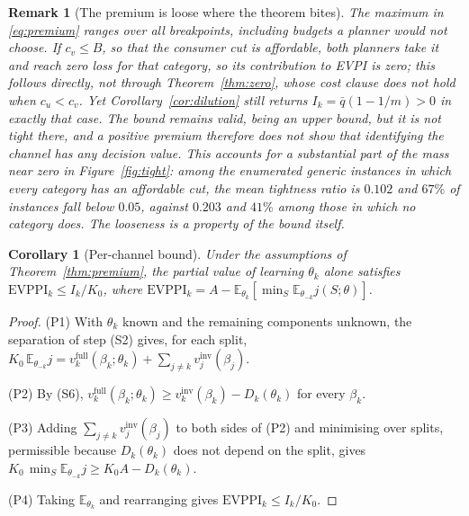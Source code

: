 \documentclass[pdflatex,sn-mathphys-num]{sn-jnl}
\theoremstyle{thmstyleone}
\newtheorem{corollary}[theorem]{Corollary}
\theoremstyle{thmstyletwo}
\newtheorem{remark}{Remark}
\theoremstyle{thmstylethree}
\newcommand{\evppi}{\mathrm{EVPPI}}
\begin{document}
\begin{remark}[The premium is loose where the theorem bites]\label{rem:loose}
The maximum in \eqref{eq:premium} ranges over all breakpoints, including
budgets a planner would not choose. If $c_v\le B$, so that the consumer cut is
affordable, both planners take it and reach zero loss for that category, so
its contribution to EVPI is zero; this follows directly, not through
Theorem~\ref{thm:zero}, whose cost clause does not hold when $c_u<c_v$. Yet
Corollary~\ref{cor:dilution} still returns $I_k=\bar q(1-1/m)>0$ in exactly
that case. The bound remains valid, being an upper bound, but it is not tight
there, and a positive premium therefore does not show that identifying the
channel has any decision value. This accounts for a substantial part of the mass near zero in
Figure~\ref{fig:tight}: among the enumerated generic instances in which every
category has an affordable cut, the mean tightness ratio is $0.102$ and
$67\%$ of instances fall below $0.05$, against $0.203$ and $41\%$ among those
in which no category does. The looseness is a property of the bound itself.
\end{remark}

\begin{corollary}[Per-channel bound]\label{cor:evppi}
Under the assumptions of Theorem~\ref{thm:premium}, the partial value of
learning $\theta_k$ alone satisfies $\evppi_k\le I_k/K_0$, where
$\evppi_k=A-\mathbb{E}_{\theta_k}\!\left[\min_S\mathbb{E}_{\theta_{-k}}
j(S;\theta)\right]$.
\end{corollary}

\begin{proof}
(P1) With $\theta_k$ known and the remaining components unknown, the
separation of step (S2) gives, for each split,
$K_0\,\mathbb{E}_{\theta_{-k}}j=v_k^{\mathrm{full}}(\beta_k;\theta_k)
+\sum_{j\ne k}v_j^{\mathrm{inv}}(\beta_j)$.

\noindent(P2) By (S6), $v_k^{\mathrm{full}}(\beta_k;\theta_k)\ge
v_k^{\mathrm{inv}}(\beta_k)-D_k(\theta_k)$ for every $\beta_k$.

\noindent(P3) Adding $\sum_{j\ne k}v_j^{\mathrm{inv}}(\beta_j)$ to both sides
of (P2) and minimising over splits, permissible because $D_k(\theta_k)$ does
not depend on the split, gives $K_0\,\min_S\mathbb{E}_{\theta_{-k}}j\ge
K_0A-D_k(\theta_k)$.

\noindent(P4) Taking $\mathbb{E}_{\theta_k}$ and rearranging gives
$\evppi_k\le I_k/K_0$.
\end{proof}
\end{document}
